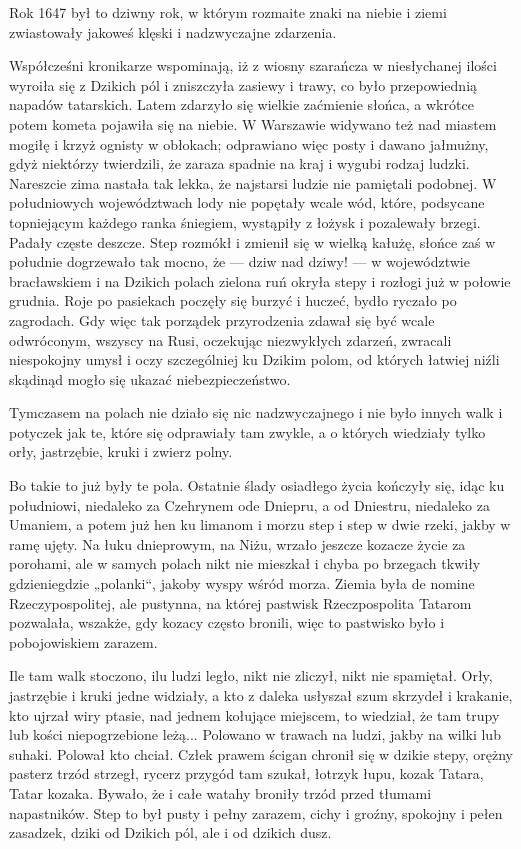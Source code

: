 Rok 1647 był to dziwny rok, w którym rozmaite znaki na niebie i ziemi zwiastowały jakoweś klęski i nadzwyczajne zdarzenia.

Współcześni kronikarze wspominają, iż z wiosny szarańcza w niesłychanej ilości wyroiła się z Dzikich pól i zniszczyła zasiewy i trawy, co było przepowiednią napadów tatarskich. Latem zdarzyło się wielkie zaćmienie słońca, a wkrótce potem kometa pojawiła się na niebie. W Warszawie widywano też nad miastem mogiłę i krzyż ognisty w obłokach; odprawiano więc posty i dawano jałmużny, gdyż niektórzy twierdzili, że zaraza spadnie na kraj i wygubi rodzaj ludzki. Nareszcie zima nastała tak lekka, że najstarsi ludzie nie pamiętali podobnej. W południowych województwach lody nie popętały wcale wód, które, podsycane topniejącym każdego ranka śniegiem, wystąpiły z łożysk i pozalewały brzegi. Padały częste deszcze. Step rozmókł i zmienił się w wielką kałużę, słońce zaś w południe dogrzewało tak mocno, że — dziw nad dziwy! — w województwie bracławskiem i na Dzikich polach zielona ruń okryła stepy i rozłogi już w połowie grudnia. Roje po pasiekach poczęły się burzyć i huczeć, bydło ryczało po zagrodach. Gdy więc tak porządek przyrodzenia zdawał się być wcale odwróconym, wszyscy na Rusi, oczekując niezwykłych zdarzeń, zwracali niespokojny umysł i oczy szczególniej ku Dzikim polom, od których łatwiej niźli skądinąd mogło się ukazać niebezpieczeństwo.

Tymczasem na polach nie działo się nic nadzwyczajnego i nie było innych walk i potyczek jak te, które się odprawiały tam zwykle, a o których wiedziały tylko orły, jastrzębie, kruki i zwierz polny.

Bo takie to już były te pola. Ostatnie ślady osiadłego życia kończyły się, idąc ku południowi, niedaleko za Czehrynem ode Dniepru, a od Dniestru, niedaleko za Umaniem, a potem już hen ku limanom i morzu step i step w dwie rzeki, jakby w ramę ujęty. Na łuku dnieprowym, na Niżu, wrzało jeszcze kozacze życie za porohami, ale w samych polach nikt nie mieszkał i chyba po brzegach tkwiły gdzieniegdzie „polanki“, jakoby wyspy wśród morza. Ziemia była de nomine Rzeczypospolitej, ale pustynna, na której pastwisk Rzeczpospolita Tatarom pozwalała, wszakże, gdy kozacy często bronili, więc to pastwisko było i pobojowiskiem zarazem.

Ile tam walk stoczono, ilu ludzi legło, nikt nie zliczył, nikt nie spamiętał. Orły, jastrzębie i kruki jedne widziały, a kto z daleka usłyszał szum skrzydeł i krakanie, kto ujrzał wiry ptasie, nad jednem kołujące miejscem, to wiedział, że tam trupy lub kości niepogrzebione leżą... Polowano w trawach na ludzi, jakby na wilki lub suhaki. Polował kto chciał. Człek prawem ścigan chronił się w dzikie stepy, orężny pasterz trzód strzegł, rycerz przygód tam szukał, łotrzyk łupu, kozak Tatara, Tatar kozaka. Bywało, że i całe watahy broniły trzód przed tłumami napastników. Step to był pusty i pełny zarazem, cichy i groźny, spokojny i pełen zasadzek, dziki od Dzikich pól, ale i od dzikich dusz.

